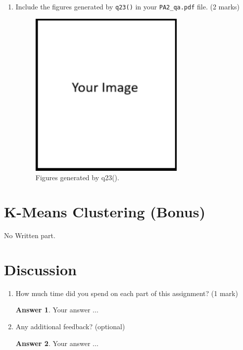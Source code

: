 \documentclass{article}
\theoremstyle{definition}
\newtheorem*{answer}{Answer}
\begin{document}
\begin{enumerate}[label=\ref{fit}.\alph*]
\begin{enumerate}[label=2.2.b.\roman*]
		\item Include the figures generated by \verb|q23()| in your \verb|PA2_qa.pdf| file. (2 marks)
		\begin{figure}[h]
			\centering
			\includegraphics[height=3.2in]{image.png}
			\caption{Figures generated by q23().}
		\end{figure}
	\end{enumerate}
\end{enumerate}
\newpage
\section{K-Means Clustering (Bonus)}\label{clus}
No Written part.
\section{Discussion}\label{disc}
\begin{enumerate}[label=\ref{disc}.\alph*]
	\item How much time did you spend on each part of this assignment? (1 mark)
	\begin{answer}
		Your answer ...
	\end{answer}
	\item Any additional feedback? (optional)
	\begin{answer}
		Your answer ...
	\end{answer}
\end{enumerate}
\end{document}
